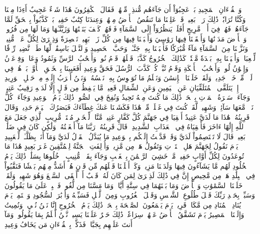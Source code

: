 قٓۚ وَٱلۡقُرۡءَانِ ٱلۡمَجِيدِ
بَلۡ عَجِبُوٓاْ أَن جَآءَهُم مُّنذِرٞ مِّنۡهُمۡ فَقَالَ ٱلۡكَٰفِرُونَ هَٰذَا شَيۡءٌ عَجِيبٌ
أَءِذَا مِتۡنَا وَكُنَّا تُرَابٗاۖ ذَٰلِكَ رَجۡعُۢ بَعِيدٞ
قَدۡ عَلِمۡنَا مَا تَنقُصُ ٱلۡأَرۡضُ مِنۡهُمۡۖ وَعِندَنَا كِتَٰبٌ حَفِيظُۢ
بَلۡ كَذَّبُواْ بِٱلۡحَقِّ لَمَّا جَآءَهُمۡ فَهُمۡ فِيٓ أَمۡرٖ مَّرِيجٍ
أَفَلَمۡ يَنظُرُوٓاْ إِلَى ٱلسَّمَآءِ فَوۡقَهُمۡ كَيۡفَ بَنَيۡنَٰهَا وَزَيَّنَّـٰهَا وَمَا لَهَا مِن فُرُوجٖ
وَٱلۡأَرۡضَ مَدَدۡنَٰهَا وَأَلۡقَيۡنَا فِيهَا رَوَٰسِيَ وَأَنۢبَتۡنَا فِيهَا مِن كُلِّ زَوۡجِۭ بَهِيجٖ
تَبۡصِرَةٗ وَذِكۡرَىٰ لِكُلِّ عَبۡدٖ مُّنِيبٖ
وَنَزَّلۡنَا مِنَ ٱلسَّمَآءِ مَآءٗ مُّبَٰرَكٗا فَأَنۢبَتۡنَا بِهِۦ جَنَّـٰتٖ وَحَبَّ ٱلۡحَصِيدِ
وَٱلنَّخۡلَ بَاسِقَٰتٖ لَّهَا طَلۡعٞ نَّضِيدٞ
رِّزۡقٗا لِّلۡعِبَادِۖ وَأَحۡيَيۡنَا بِهِۦ بَلۡدَةٗ مَّيۡتٗاۚ كَذَٰلِكَ ٱلۡخُرُوجُ
كَذَّبَتۡ قَبۡلَهُمۡ قَوۡمُ نُوحٖ وَأَصۡحَٰبُ ٱلرَّسِّ وَثَمُودُ
وَعَادٞ وَفِرۡعَوۡنُ وَإِخۡوَٰنُ لُوطٖ
وَأَصۡحَٰبُ ٱلۡأَيۡكَةِ وَقَوۡمُ تُبَّعٖۚ كُلّٞ كَذَّبَ ٱلرُّسُلَ فَحَقَّ وَعِيدِ
أَفَعَيِينَا بِٱلۡخَلۡقِ ٱلۡأَوَّلِۚ بَلۡ هُمۡ فِي لَبۡسٖ مِّنۡ خَلۡقٖ جَدِيدٖ
وَلَقَدۡ خَلَقۡنَا ٱلۡإِنسَٰنَ وَنَعۡلَمُ مَا تُوَسۡوِسُ بِهِۦ نَفۡسُهُۥۖ وَنَحۡنُ أَقۡرَبُ إِلَيۡهِ مِنۡ حَبۡلِ ٱلۡوَرِيدِ
إِذۡ يَتَلَقَّى ٱلۡمُتَلَقِّيَانِ عَنِ ٱلۡيَمِينِ وَعَنِ ٱلشِّمَالِ قَعِيدٞ
مَّا يَلۡفِظُ مِن قَوۡلٍ إِلَّا لَدَيۡهِ رَقِيبٌ عَتِيدٞ
وَجَآءَتۡ سَكۡرَةُ ٱلۡمَوۡتِ بِٱلۡحَقِّۖ ذَٰلِكَ مَا كُنتَ مِنۡهُ تَحِيدُ
وَنُفِخَ فِي ٱلصُّورِۚ ذَٰلِكَ يَوۡمُ ٱلۡوَعِيدِ
وَجَآءَتۡ كُلُّ نَفۡسٖ مَّعَهَا سَآئِقٞ وَشَهِيدٞ
لَّقَدۡ كُنتَ فِي غَفۡلَةٖ مِّنۡ هَٰذَا فَكَشَفۡنَا عَنكَ غِطَآءَكَ فَبَصَرُكَ ٱلۡيَوۡمَ حَدِيدٞ
وَقَالَ قَرِينُهُۥ هَٰذَا مَا لَدَيَّ عَتِيدٌ
أَلۡقِيَا فِي جَهَنَّمَ كُلَّ كَفَّارٍ عَنِيدٖ
مَّنَّاعٖ لِّلۡخَيۡرِ مُعۡتَدٖ مُّرِيبٍ
ٱلَّذِي جَعَلَ مَعَ ٱللَّهِ إِلَٰهًا ءَاخَرَ فَأَلۡقِيَاهُ فِي ٱلۡعَذَابِ ٱلشَّدِيدِ
۞قَالَ قَرِينُهُۥ رَبَّنَا مَآ أَطۡغَيۡتُهُۥ وَلَٰكِن كَانَ فِي ضَلَٰلِۭ بَعِيدٖ
قَالَ لَا تَخۡتَصِمُواْ لَدَيَّ وَقَدۡ قَدَّمۡتُ إِلَيۡكُم بِٱلۡوَعِيدِ
مَا يُبَدَّلُ ٱلۡقَوۡلُ لَدَيَّ وَمَآ أَنَا۠ بِظَلَّـٰمٖ لِّلۡعَبِيدِ
يَوۡمَ نَقُولُ لِجَهَنَّمَ هَلِ ٱمۡتَلَأۡتِ وَتَقُولُ هَلۡ مِن مَّزِيدٖ
وَأُزۡلِفَتِ ٱلۡجَنَّةُ لِلۡمُتَّقِينَ غَيۡرَ بَعِيدٍ
هَٰذَا مَا تُوعَدُونَ لِكُلِّ أَوَّابٍ حَفِيظٖ
مَّنۡ خَشِيَ ٱلرَّحۡمَٰنَ بِٱلۡغَيۡبِ وَجَآءَ بِقَلۡبٖ مُّنِيبٍ
ٱدۡخُلُوهَا بِسَلَٰمٖۖ ذَٰلِكَ يَوۡمُ ٱلۡخُلُودِ
لَهُم مَّا يَشَآءُونَ فِيهَا وَلَدَيۡنَا مَزِيدٞ
وَكَمۡ أَهۡلَكۡنَا قَبۡلَهُم مِّن قَرۡنٍ هُمۡ أَشَدُّ مِنۡهُم بَطۡشٗا فَنَقَّبُواْ فِي ٱلۡبِلَٰدِ هَلۡ مِن مَّحِيصٍ
إِنَّ فِي ذَٰلِكَ لَذِكۡرَىٰ لِمَن كَانَ لَهُۥ قَلۡبٌ أَوۡ أَلۡقَى ٱلسَّمۡعَ وَهُوَ شَهِيدٞ
وَلَقَدۡ خَلَقۡنَا ٱلسَّمَٰوَٰتِ وَٱلۡأَرۡضَ وَمَا بَيۡنَهُمَا فِي سِتَّةِ أَيَّامٖ وَمَا مَسَّنَا مِن لُّغُوبٖ
فَٱصۡبِرۡ عَلَىٰ مَا يَقُولُونَ وَسَبِّحۡ بِحَمۡدِ رَبِّكَ قَبۡلَ طُلُوعِ ٱلشَّمۡسِ وَقَبۡلَ ٱلۡغُرُوبِ
وَمِنَ ٱلَّيۡلِ فَسَبِّحۡهُ وَأَدۡبَٰرَ ٱلسُّجُودِ
وَٱسۡتَمِعۡ يَوۡمَ يُنَادِ ٱلۡمُنَادِ مِن مَّكَانٖ قَرِيبٖ
يَوۡمَ يَسۡمَعُونَ ٱلصَّيۡحَةَ بِٱلۡحَقِّۚ ذَٰلِكَ يَوۡمُ ٱلۡخُرُوجِ
إِنَّا نَحۡنُ نُحۡيِۦ وَنُمِيتُ وَإِلَيۡنَا ٱلۡمَصِيرُ
يَوۡمَ تَشَقَّقُ ٱلۡأَرۡضُ عَنۡهُمۡ سِرَاعٗاۚ ذَٰلِكَ حَشۡرٌ عَلَيۡنَا يَسِيرٞ
نَّحۡنُ أَعۡلَمُ بِمَا يَقُولُونَۖ وَمَآ أَنتَ عَلَيۡهِم بِجَبَّارٖۖ فَذَكِّرۡ بِٱلۡقُرۡءَانِ مَن يَخَافُ وَعِيدِ